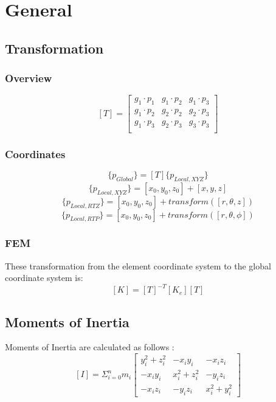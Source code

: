 \section{General}
   \subsection{Transformation}
     \subsubsection{Overview}
     \[ [T] = 
            \left[ \begin{array}{ccc}
               g_1 \cdot p_1 & g_1 \cdot p_2 & g_1 \cdot p_3 \\
               g_1 \cdot p_2 & g_2 \cdot p_2 & g_2 \cdot p_3 \\
               g_1 \cdot p_3 & g_2 \cdot p_3 & g_3 \cdot p_3 \\
            \end{array}\right]\]
     \subsubsection{Coordinates}
      \[ \{p_{Global}\}  = [T]\{p_{Local,XYZ}\} \]
      \[ \{p_{Local,XYZ}\} = [x_0,y_0,z_0]+[x,y,z] \]
      \[ \{p_{Local,RTZ}\} = [x_0,y_0,z_0]+transform([r,\theta,   z]) \]
      \[ \{p_{Local,RTP}\} = [x_0,y_0,z_0]+transform([r,\theta,\phi]) \]

     \subsubsection{FEM}
      These transformation from the element coordinate system to the global coordinate system is:
      \[ [K] = [T]^{-T} [K_e] [T]  \]

  \subsection{Moments of Inertia}
    Moments of Inertia are calculated as follows \cite{momentInertia}:
    \[ [I] = \Sigma_{i=0}^n m_i \left[ \begin{array}{ccc}
               y_i^2+z_i^2 & -x_i y_i    & -x_i z_i  \\
               -x_i y_i    & x_i^2+z_i^2 & -y_i z_i  \\
               -x_i z_i    & -y_i z_i    & x_i^2+y_i^2
            \end{array}\right] \]
